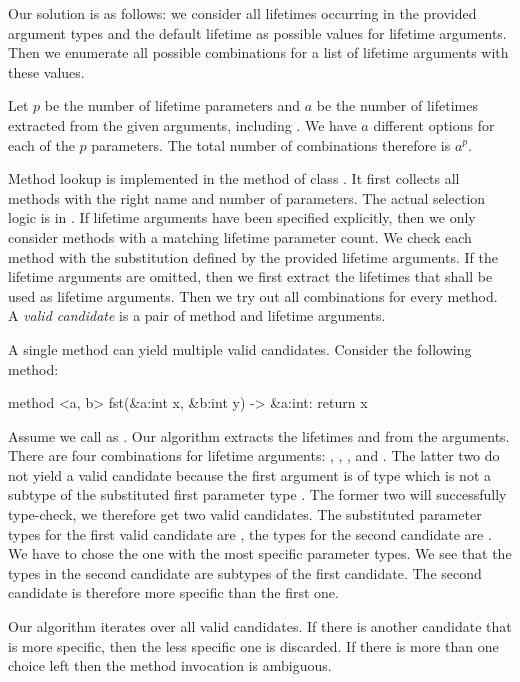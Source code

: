 Our solution is as follows:
we consider all lifetimes occurring in the provided argument types and the default lifetime \whileyinline{*} as possible values for lifetime arguments.
Then we enumerate all possible combinations for a list of lifetime arguments with these values.

Let $p$ be the number of lifetime parameters and $a$ be the number of lifetimes extracted from the given arguments, including \whileyinline{*}.
We have $a$ different options for each of the $p$ parameters.
The total number of combinations therefore is $a^p$.

\begin{sloppypar}
Method lookup is implemented in the  method of class .
It first collects all methods with the right name and number of parameters.
The actual selection logic is in .
If lifetime arguments have been specified explicitly, then we only consider methods with a matching lifetime parameter count.
We check each method with the substitution defined by the provided lifetime arguments.
If the lifetime arguments are omitted, then we first extract the lifetimes that shall be used as lifetime arguments.
Then we try out all combinations for every method.
A \emph{valid candidate} is a pair of method and lifetime arguments.
\end{sloppypar}

A single method can yield multiple valid candidates.
Consider the following method:

\begin{whileycode}
method <a, b> fst(&a:int x, &b:int y) -> &a:int:
	return x
\end{whileycode}

\noindent Assume we call  as .
Our algorithm extracts the lifetimes  and \whileyinline{*} from the arguments.
There are four combinations for lifetime arguments: , , , and \whileyinline{<*, *>}.
The latter two do not yield a valid candidate because the first argument is of type  which is not a subtype of the substituted first parameter type .
The former two will successfully type-check, we therefore get two valid candidates.
The substituted parameter types for the first valid candidate are , the types for the second candidate are .
We have to chose the one with the most specific parameter types.
We see that the types in the second candidate are subtypes of the first candidate.
The second candidate is therefore more specific than the first one.

Our algorithm iterates over all valid candidates.
If there is another candidate that is more specific, then the less specific one is discarded.
If there is more than one choice left then the method invocation is ambiguous.
